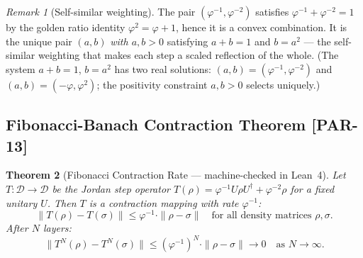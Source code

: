 \documentclass[12pt, letterpaper]{article}
\theoremstyle{plain}
\newtheorem{theorem}{Theorem}[section]
\theoremstyle{definition}
\theoremstyle{remark}
\newtheorem{remark}[theorem]{Remark}
\newcommand{\phiinv}{\varphi^{-1}}
\newcommand{\phiinvsq}{\varphi^{-2}}
\newcommand{\prior}[1]{\textcolor{SovGold}{\textbf{[PAR-#1]}}}
\begin{document}
\begin{remark}[Self-similar weighting]
The pair $(\phiinv, \phiinvsq)$ satisfies $\phiinv + \phiinvsq = 1$ by the
golden ratio identity $\varphi^2 = \varphi + 1$, hence it is a convex combination.
It is the unique pair $(a, b)$ \textit{with $a, b > 0$} satisfying $a + b = 1$ and $b = a^2$
--- the self-similar weighting that makes each step a scaled reflection of the whole.
(The system $a+b=1$, $b=a^2$ has two real solutions: $(a,b) = (\phiinv, \phiinvsq)$
and $(a,b) = (-\varphi, \varphi^2)$; the positivity constraint $a,b > 0$ selects uniquely.)
\end{remark}

\subsection{Fibonacci-Banach Contraction Theorem \prior{13}}

\begin{theorem}[Fibonacci Contraction Rate --- machine-checked in Lean~4]
\label{thm:fibonacci_contraction}
Let $T : \mathcal{D} \to \mathcal{D}$ be the Jordan step operator
$T(\rho) = \phiinv U\rho U^\dagger + \phiinvsq\rho$ for a fixed unitary $U$.
Then $T$ is a contraction mapping with rate $\phiinv$:
\[
  \|T(\rho) - T(\sigma)\| \leq \phiinv \cdot \|\rho - \sigma\|
  \quad \text{for all density matrices } \rho, \sigma.
\]
After $N$ layers:
\[
  \|T^N(\rho) - T^N(\sigma)\| \leq (\phiinv)^N \cdot \|\rho - \sigma\| \to 0
  \quad \text{as } N \to \infty.
\]
\end{theorem}
\end{document}
